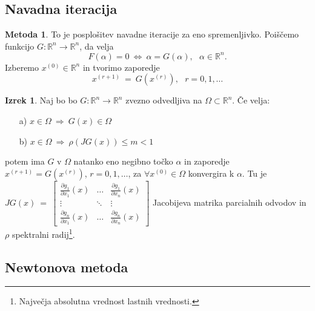 \documentclass[11pt]{article}
\theoremstyle{definition}
\newtheorem{izrek}{Izrek}
\newtheorem*{metoda}{Metoda}
\begin{document}

\subsection{Navadna iteracija}
\vspace{0.5cm}

\begin{metoda}

To je posplošitev navadne iteracije za eno spremenljivko. Poiščemo funkcijo $G: \mathbb{R}^n \rightarrow \mathbb{R}^n$, da velja
$$F(\alpha) = 0 ~\Leftrightarrow~ \alpha = G(\alpha), ~~~\alpha \in \mathbb{R}^n.$$
Izberemo $x^{(0)} \in \mathbb{R}^n$ in tvorimo zaporedje
$$x^{(r+1)} ~=~ G(x^{(r)}), ~~~r = 0, 1, \ldots$$

\end{metoda}
\vspace{0.5cm}

\begin{izrek}

Naj bo bo $G: \mathbb{R}^n \rightarrow \mathbb{R}^n$ zvezno odvedljiva na $\Omega \subset \mathbb{R}^n$. Če velja:
\begin{enumerate}
	\item[a)] $x \in \Omega ~\Rightarrow~ G(x) \in \Omega$
	\item[b)] $x \in \Omega ~\Rightarrow~ \rho(JG(x)) \leq m < 1$
\end{enumerate}
potem ima $G$ v $\Omega$ natanko eno negibno točko $\alpha$ in zaporedje $x^{(r+1)} = G(x^{(r)})$, $r = 0, 1, \ldots$, za $\forall x^{(0)} \in \Omega$ konvergira k $\alpha$. Tu je
$JG(x) ~=~ \begin{bmatrix}
\frac{\partial g_1}{\partial x_1}(x) & \ldots & \frac{\partial g_1}{\partial x_n}(x) \\
\vdots & \ddots & \vdots \\
\frac{\partial g_n}{\partial x_1}(x) & \ldots & \frac{\partial g_n}{\partial x_n}(x)
\end{bmatrix}$
Jacobijeva matrika parcialnih odvodov in $\rho$ spektralni radij\footnote{Največja absolutna vrednost lastnih vrednosti.}.

\end{izrek}
\vspace{0.5cm}


\subsection{Newtonova metoda}
\vspace{0.5cm}
\end{document}
